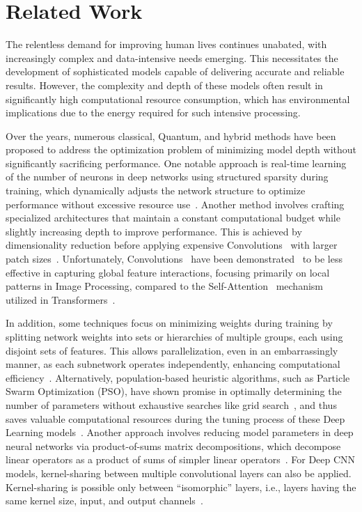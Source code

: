 \documentclass[12pt,a4paper]{report}
\begin{document}
\chapter{Related Work}\vspace{-12pt}
The relentless demand for improving human lives continues unabated, with increasingly complex and data-intensive needs emerging. This necessitates the development of sophisticated models capable of delivering accurate and reliable results. However, the complexity and depth of these models often result in significantly high computational resource consumption, which has environmental implications due to the energy required for such intensive processing.

Over the years, numerous classical, Quantum, and hybrid methods have been proposed to address the optimization problem of minimizing model depth without significantly sacrificing performance. One notable approach is real-time learning of the number of neurons in deep networks using structured sparsity during training, which dynamically adjusts the network structure to optimize performance without excessive resource use~\cite{alvarez2018learning}. Another method involves crafting specialized architectures that maintain a constant computational budget while slightly increasing depth to improve performance. This is achieved by dimensionality reduction before applying expensive Convolutions~\cite{wen2021convolutional} with larger patch sizes~\cite{Szegedy_2015_CVPR}. Unfortunately, Convolutions~\cite{wen2021convolutional} have been demonstrated~\cite{cordonnier2020relationship} to be less effective in capturing global feature interactions, focusing primarily on local patterns in Image Processing, compared to the Self-Attention~\cite{voita2019analyzing} mechanism utilized in Transformers~\cite{vaswani2017attention}.

In addition, some techniques focus on minimizing weights during training by splitting network weights into sets or hierarchies of multiple groups, each using disjoint sets of features. This allows parallelization, even in an embarrassingly manner, as each subnetwork operates independently, enhancing computational efficiency~\cite{pmlr-v70-kim17b}. Alternatively, population-based heuristic algorithms, such as Particle Swarm Optimization (PSO), have shown promise in optimally determining the number of parameters without exhaustive searches like grid search~\cite{liashchynskyi2019grid}, and thus saves valuable computational resources during the tuning process of these Deep Learning models~\cite{7986470}. Another approach involves reducing model parameters in deep neural networks via product-of-sums matrix decompositions, which decompose linear operators as a product of sums of simpler linear operators~\cite{wu2018prodsumnet}. For Deep CNN models, kernel-sharing between multiple convolutional layers can also be applied. Kernel-sharing is possible only between “isomorphic” layers, i.e., layers having the same kernel size, input, and output channels~\cite{azadbakht2022drastically}.
\end{document}
